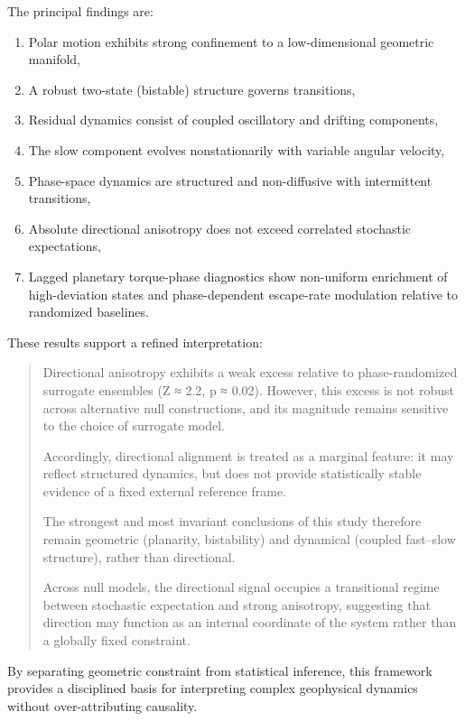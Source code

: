 \documentclass[twocolumn,9pt]{revtex4-2}
\begin{document}
The principal findings are:

\begin{enumerate}
\item Polar motion exhibits strong confinement to a
low-dimensional geometric manifold,
\item A robust two-state (bistable) structure governs
transitions,
\item Residual dynamics consist of coupled oscillatory
and drifting components,
\item The slow component evolves nonstationarily with
variable angular velocity,
\item Phase-space dynamics are structured and
non-diffusive with intermittent transitions,
\item Absolute directional anisotropy does not exceed
correlated stochastic expectations,
\item Lagged planetary torque-phase diagnostics show non-uniform enrichment of high-deviation states and phase-dependent escape-rate modulation relative to randomized baselines.
\end{enumerate}

These results support a refined interpretation:

\begin{quote}
Directional anisotropy exhibits a weak excess relative to
phase-randomized surrogate ensembles (Z ≈ 2.2, p ≈ 0.02).
However, this excess is not robust across alternative null
constructions, and its magnitude remains sensitive to the
choice of surrogate model.

Accordingly, directional alignment is treated as a
marginal feature: it may reflect structured dynamics, but
does not provide statistically stable evidence of a fixed
external reference frame.

The strongest and most invariant conclusions of this study
therefore remain geometric (planarity, bistability) and
dynamical (coupled fast–slow structure), rather than
directional.

Across null models, the directional signal occupies a
transitional regime between stochastic expectation and
strong anisotropy, suggesting that direction may function
as an internal coordinate of the system rather than a
globally fixed constraint.\end{quote}

By separating geometric constraint from statistical
inference, this framework provides a disciplined basis
for interpreting complex geophysical dynamics without
over-attributing causality.
\end{document}
